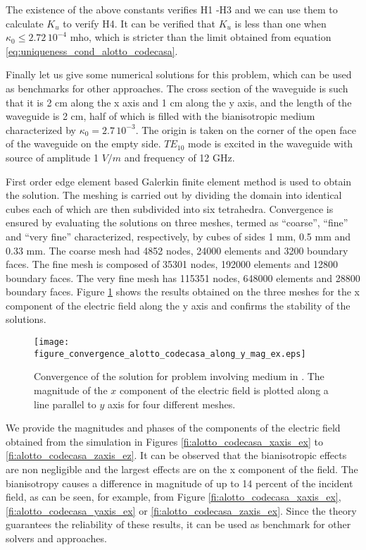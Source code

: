 The existence of the above constants verifies H1 -H3 and we can use them to 
calculate $K_u$ to verify H4.
It can be verified that $K_u$ is less than one when $\kappa_0 \leq 2.72 \, 10^{-4}$ mho,
which is stricter than the limit obtained from equation \eqref{eq:uniqueness_cond_alotto_codecasa}.

Finally let us give some numerical solutions for this problem, which can be used as benchmarks for other 
approaches.
The cross section of the waveguide is such that it is 2 cm along the x axis and  1 cm along the y axis, and 
the length of the waveguide is 2 cm, half of which is filled with the bianisotropic medium  characterized by 
$\kappa_0 = 2.7 \, 10^{-3}$.
The origin is taken on the corner of the open face of the waveguide on the empty side.
$TE_{10}$ mode is excited in the waveguide with source of amplitude 1 $V/m$ and frequency of 12 GHz.

First order edge element based Galerkin finite element method is used to obtain the solution.
The meshing is carried out by dividing the domain into identical cubes each of which are then 
subdivided into six tetrahedra.
Convergence is ensured by evaluating the solutions on three meshes, 
termed as ``coarse'', ``fine'' and ``very fine'' characterized, respectively, by cubes of sides 1 mm, 
0.5 mm and 0.33 mm.
The coarse mesh had 4852 nodes, 24000 elements and 3200 boundary faces.
The fine mesh is composed of 35301 nodes, 192000 elements and 12800 boundary faces.
The very fine mesh has 115351 nodes, 648000 elements and 28800 boundary faces.
Figure \ref{fi:alotto_codecasa_convergence} shows the results obtained on the three 
meshes for the x component of the electric field along the y axis and confirms the 
stability of the solutions.

\begin{figure}
\texttt{[image: figure\_convergence\_alotto\_codecasa\_along\_y\_mag\_ex.eps]}
\caption{Convergence of the solution for problem involving medium in \cite{alottocodecasa}.
The magnitude of the $x$ component of the electric field is plotted
along a line parallel to $y$ axis for four different meshes.}
\label{fi:alotto_codecasa_convergence}
\end{figure}

We provide the magnitudes and phases of the components of the electric field obtained from the 
simulation in Figures \ref{fi:alotto_codecasa_xaxis_ex} to \ref{fi:alotto_codecasa_zaxis_ez}.
It can be observed that the bianisotropic effects are non negligible and the largest effects 
are on the x component of the field.
The bianisotropy causes a difference in magnitude of up to 14 percent of the incident 
field, as can be seen,  for example, from Figure  \ref{fi:alotto_codecasa_xaxis_ex}, 
\ref{fi:alotto_codecasa_yaxis_ex} or  \ref{fi:alotto_codecasa_zaxis_ex}.
Since the theory guarantees the reliability of these results, it can be used as benchmark for 
other solvers and approaches.


